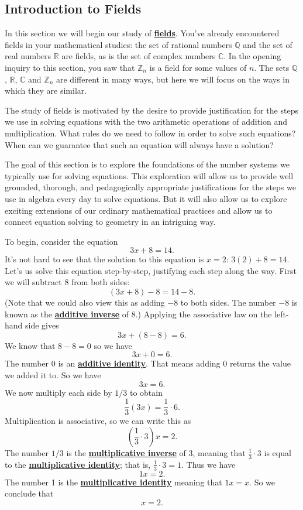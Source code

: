 \documentclass[11pt]{article}
\renewcommand\emph[1]{\underline{\bf{#1}}} %
\theoremstyle{definition}
\begin{document}
\subsection{Introduction to Fields}

In this section we will begin our study of \emph{fields}. You've already encountered fields in your mathematical studies: the set of rational numbers $\mathbb{Q}$ 
and the set of real numbers $\mathbb{R}$ are fields, as is the set of complex numbers $\mathbb{C}$. In the opening inquiry to this section, you saw that
$\mathbb{Z}_n$ is a field for some values of $n$. The sets $\mathbb{Q}$, $\mathbb{R}$, $\mathbb{C}$ and $\mathbb{Z}_n$ are 
different in many ways, but here we will focus on the ways in which they are similar. 

The study of fields is motivated by the desire to provide justification for the steps we use in solving equations with the two arithmetic operations of
addition and multiplication. What rules do we need to follow in order to solve such equations? When can we guarantee that such an equation will always 
have a solution?

The goal of this section is to explore the foundations of the number systems we typically use for solving equations. This exploration will allow us to provide 
well grounded, thorough, and pedagogically appropriate justifications for the steps we use in algebra every day to solve equations. But it will also allow 
us to explore exciting extensions of our ordinary mathematical practices and allow us to connect equation solving to geometry in an intriguing way.

To begin, consider the equation
      \[ 3x + 8 = 14. \]
It's not hard to see that the solution to this equation is $x=2$: $3(2)+8 = 14$. Let's us solve this equation step-by-step, justifying each step along the 
way. First we will subtract $8$ from both sides:
\[ (3x+8)-8 = 14 -8.\]
(Note that we could also view this as adding $-8$ to both sides. The number $-8$ is known as the \emph{additive inverse} of $8$.) Applying the associative 
law on the left-hand side gives
\[ 3x + (8-8) = 6.\]
We know that $8-8=0$ so we have
\[ 3x + 0 = 6.\]
The number 0 is an \emph{additive identity}. That means adding 0 returns the value we added it to. So we have
\[ 3x = 6.\]
We now multiply each side by $1/3$ to obtain
\[ \frac{1}{3}(3x) = \frac{1}{3}\cdot 6. \]
Multiplication is associative, so we can write this as
\[ \left( \frac{1}{3}\cdot 3 \right)x = 2. \]
The number $1/3$ is the \emph{multiplicative inverse} of $3$, meaning that $\frac{1}{3}\cdot 3$ is equal to the \emph{multiplicative identity}; that is, $\frac{1}{3}\cdot 3 = 1$. Thus we have
\[ 1x = 2.\]
The number 1 is the \emph{multiplicative identity} meaning that $1x = x$. So we conclude that
\[ x = 2.\]
\end{document}

